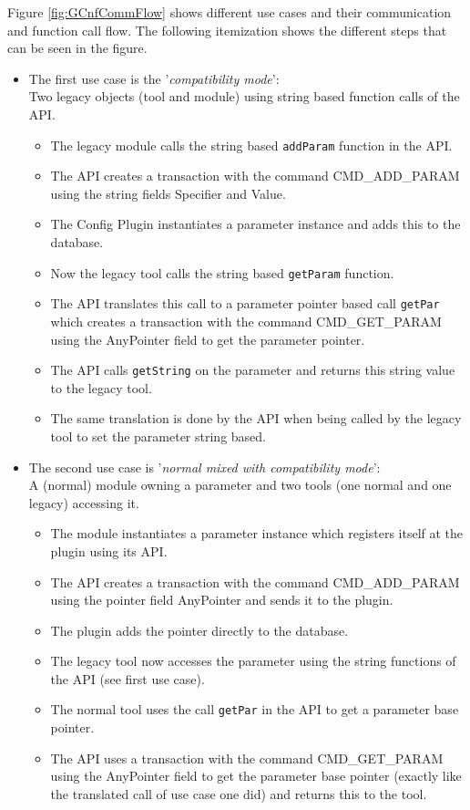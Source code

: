 Figure \ref{fig:GCnfCommFlow} shows different use cases and their communication and function call flow. The following itemization shows the different steps that can be seen in the figure.

\begin{itemize}
  \item The first use case is the '{\em compatibility mode}':\\
           Two legacy objects (tool and module) using string based function calls of the \GreenConfig API.
  \begin{itemize}
    \item The legacy module calls the string based \lstinline|addParam| function in the API.
    \item The API creates a transaction with the command CMD\_ADD\_PARAM using the string fields \textsf{Specifier} and \textsf{Value}.
    \item The Config Plugin instantiates a parameter instance and adds this to the database.
    \item Now the legacy tool calls the string based \lstinline|getParam| function.
    \item The API translates this call to a parameter pointer based call \lstinline|getPar| which creates a transaction with the command CMD\_GET\_PARAM using the \textsf{AnyPointer} field to get the parameter pointer.
    \item The API calls \lstinline|getString| on the parameter and returns this string value to the legacy tool.
    \item The same translation is done by the API when being called by the legacy tool to set the parameter string based.
  \end{itemize}

  \item The second use case is '{\em normal mixed with compatibility mode}':\\
           A (normal) module owning a parameter and two tools (one normal and one legacy) accessing it.
  \begin{itemize}
    \item The module instantiates a parameter instance which registers itself at the plugin using its \GreenConfig API.
    \item The API creates a transaction with the command CMD\_ADD\_PARAM using the pointer field \textsf{AnyPointer} and sends it to the plugin.
    \item The plugin adds the pointer directly to the database.
    \item The legacy tool now accesses the parameter using the string functions of the API (see first use case).
    \item The normal tool uses the call \lstinline|getPar| in the API to get a parameter base pointer.
    \item The API uses a transaction with the command CMD\_GET\_PARAM using the \textsf{AnyPointer} field to get the parameter base pointer (exactly like the translated call of use case one did) and returns this to the tool.
  \end{itemize}


\end{itemize}
